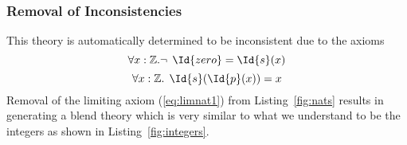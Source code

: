 \subsubsection{Removal of Inconsistencies}
This theory is automatically determined to be inconsistent due to the axioms
\begin{equation}
  \forall x : \mathbb{Z} . \neg \:\: \Id{zero} = \Id{s}(x) 
  \label{eq:limnat1}
\end{equation}
\begin{equation}
  \forall x : \mathbb{Z} . \:\: \Id{s} (\Id{p}(x)) = x 
  \label{eq:sucpre}
\end{equation}
Removal 
of the limiting axiom (\ref{eq:limnat1}) 
from Listing~\ref{fig:nats} 
results in generating a blend theory which is very
similar to what we understand to be the integers as shown in
Listing~\ref{fig:integers}.

